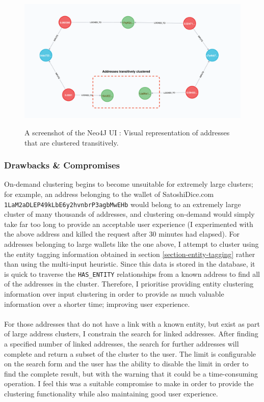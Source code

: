 \begin{figure}[h!]
  \centering
  \includegraphics[width = 15cm]{./figures/neo4j-screenshots/addresses-transitively-clustered}\\[0.5cm] 
  \caption{A screenshot of the Neo4J UI : Visual representation of addresses that are clustered transitively.}
  \label{fig:neo4j-transitive-clustering-screenshot}
\end{figure}

\subsubsection{Drawbacks \& Compromises}
On-demand clustering begins to become unsuitable for extremely large clusters; for example, an address belonging to the wallet of SatoshiDice.com \\\texttt{1LaM2aDLEP49kLbE6y2hvnbrP3agbMwEHb} would belong to an extremely large cluster of many thousands of addresses, and clustering on-demand would simply take far too long to provide an acceptable user experience (I experimented with the above address and killed the request after 30 minutes had elapsed). For addresses belonging to large wallets like the one above, I attempt to cluster using the entity tagging information obtained in section \ref{section-entity-tagging} rather than using the multi-input heuristic.
Since this data is stored in the database, it is quick to traverse the \texttt{HAS\_ENTITY} relationships from a known address to find all of the addresses in the cluster. Therefore, I prioritise providing entity clustering information over input clustering in order to provide as much valuable information over a shorter time; improving user experience. \\\\
For those addresses that do not have a link with a known entity, but exist as part of large address clusters, I constrain the search for linked addresses. After finding a specified number of linked addresses, the search for further addresses will complete and return a subset of the cluster to the user. The limit is configurable on the search form and the user has the ability to disable the limit in order to find the complete result, but with the warning that it could be a time-consuming operation. I feel this was a suitable compromise to make in order to provide the clustering functionality while also maintaining good user experience. 


